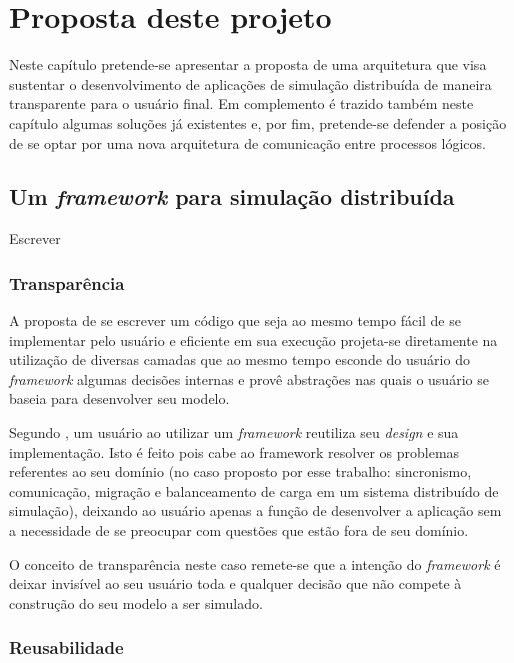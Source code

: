 \chapter{Proposta deste projeto}

Neste capítulo pretende-se apresentar a proposta de uma arquitetura que visa sustentar o desenvolvimento de aplicações de simulação distribuída de maneira transparente para o usuário final. Em complemento é trazido também neste capítulo algumas soluções já existentes e, por fim, pretende-se defender a posição de se optar por uma nova arquitetura de comunicação entre processos lógicos.

\section{Um \textit{framework} para simulação distribuída}

Escrever

\subsection{}

\subsection{Transparência}

A proposta de se escrever um código que seja ao mesmo tempo fácil de se implementar pelo usuário e eficiente em sua execução projeta-se diretamente na utilização de diversas camadas que ao mesmo tempo esconde do usuário do \textit{framework} algumas decisões internas e provê abstrações nas quais o usuário se baseia para desenvolver seu modelo.

Segundo \cite{DIRK00}, um usuário ao utilizar um \textit{framework} reutiliza seu \textit{design} e sua implementação. Isto é feito pois cabe ao framework resolver os problemas referentes ao seu domínio (no caso proposto por esse trabalho: sincronismo, comunicação, migração e balanceamento de carga em um sistema distribuído de simulação), deixando ao usuário apenas a função de desenvolver a aplicação sem a necessidade de se preocupar com questões que estão fora de seu domínio.

O conceito de transparência neste caso remete-se que a intenção do \textit{framework} é deixar invisível ao seu usuário toda e qualquer decisão que não compete à construção do seu modelo a ser simulado.

\subsection{Reusabilidade}

